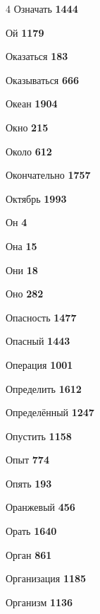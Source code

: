 \begin{multicols}{4}
\noindent Означать \dotfill \textbf{\color{secondary} 1444}\par
\noindent Ой \dotfill \textbf{\color{secondary} 1179}\par
\noindent Оказаться \dotfill \textbf{\color{secondary} 183}\par
\noindent Оказываться \dotfill \textbf{\color{secondary} 666}\par
\noindent Океан \dotfill \textbf{\color{secondary} 1904}\par
\noindent Окно \dotfill \textbf{\color{secondary} 215}\par
\noindent Около \dotfill \textbf{\color{secondary} 612}\par
\noindent Окончательно \dotfill \textbf{\color{secondary} 1757}\par
\noindent Октябрь \dotfill \textbf{\color{secondary} 1993}\par
\noindent Он \dotfill \textbf{\color{secondary} 4}\par
\noindent Она \dotfill \textbf{\color{secondary} 15}\par
\noindent Они \dotfill \textbf{\color{secondary} 18}\par
\noindent Оно \dotfill \textbf{\color{secondary} 282}\par
\noindent Опасность \dotfill \textbf{\color{secondary} 1477}\par
\noindent Опасный \dotfill \textbf{\color{secondary} 1443}\par
\noindent Операция \dotfill \textbf{\color{secondary} 1001}\par
\noindent Определить \dotfill \textbf{\color{secondary} 1612}\par
\noindent Определённый \dotfill \textbf{\color{secondary} 1247}\par
\noindent Опустить \dotfill \textbf{\color{secondary} 1158}\par
\noindent Опыт \dotfill \textbf{\color{secondary} 774}\par
\noindent Опять \dotfill \textbf{\color{secondary} 193}\par
\noindent Оранжевый \dotfill \textbf{\color{secondary} 456}\par
\noindent Орать \dotfill \textbf{\color{secondary} 1640}\par
\noindent Орган \dotfill \textbf{\color{secondary} 861}\par
\noindent Организация \dotfill \textbf{\color{secondary} 1185}\par
\noindent Организм \dotfill \textbf{\color{secondary} 1136}\par

\end{multicols}
